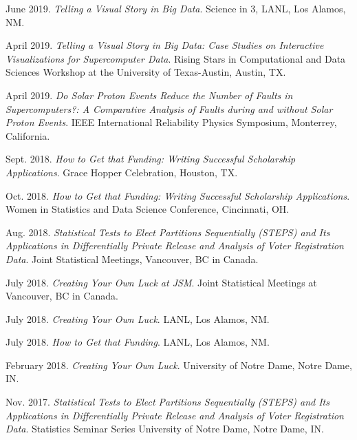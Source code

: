 \begin{etaremune}[topsep=0pt, itemsep=3pt, partopsep=0pt, parsep=0pt]
    \item June 2019. \textit{Telling a Visual Story in Big Data}. Science in 3, LANL, Los Alamos, NM. 
    
    \item April 2019. \textit{Telling a Visual Story in Big Data: Case Studies on Interactive Visualizations for Supercomputer Data}. Rising Stars in Computational and Data Sciences Workshop at the University of Texas-Austin, Austin, TX.
    
    \item April 2019. \textit{Do Solar Proton Events Reduce the Number of Faults in Supercomputers?: A Comparative Analysis of Faults during and without Solar Proton Events}. IEEE International Reliability Physics Symposium, Monterrey, California.
    
    \item Sept. 2018. \textit{How to Get that Funding: Writing Successful Scholarship Applications}. Grace Hopper Celebration, Houston, TX.
    
    \item Oct. 2018. \textit{How to Get that Funding: Writing Successful Scholarship Applications}. Women in Statistics and Data Science Conference, Cincinnati, OH.
    
    \item Aug. 2018. \textit{Statistical Tests to Elect Partitions Sequentially (STEPS) and Its Applications in Differentially Private Release and Analysis of Voter Registration Data}. Joint Statistical Meetings, Vancouver, BC in Canada.
    
    \item July 2018. \textit{Creating Your Own Luck at JSM}. Joint Statistical Meetings at Vancouver, BC in Canada.
    
    \item July 2018. \textit{Creating Your Own Luck}. LANL, Los Alamos, NM.
    
    \item July 2018. \textit{How to Get that Funding}. LANL, Los Alamos, NM.
    
    \item February 2018. \textit{Creating Your Own Luck}. University of Notre Dame, Notre Dame, IN.
    
    \item Nov. 2017. \textit{Statistical Tests to Elect Partitions Sequentially (STEPS) and Its Applications in Differentially Private Release and Analysis of Voter Registration Data}. Statistics Seminar Series University of Notre Dame, Notre Dame, IN.
    

\end{etaremune}
